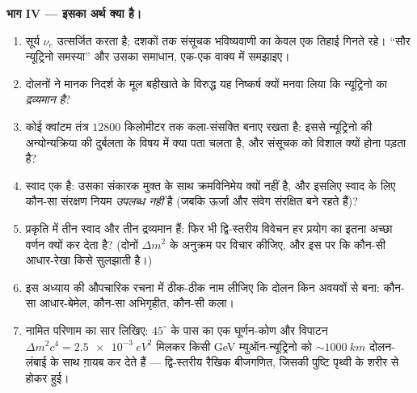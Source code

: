 \begin{problem}[{सप्ताहांत समस्या --- पृथ्वी भर में द्वि-स्तरीय
दोलन}]
\medskip\noindent\textbf{भाग IV --- इसका अर्थ क्या है।}
\begin{enumerate}[resume]
  \item सूर्य $\nu_e$ उत्सर्जित करता है; दशकों तक संसूचक भविष्यवाणी
        का केवल एक तिहाई गिनते रहे। ``सौर न्यूट्रिनो समस्या'' और
        उसका समाधान, एक-एक वाक्य में समझाइए।
  \item दोलनों ने मानक निदर्श के मूल बहीखाते के विरुद्ध यह निष्कर्ष
        क्यों मनवा लिया कि न्यूट्रिनो का \emph{द्रव्यमान है}?
  \item कोई क्वांटम तंत्र $12800$ किलोमीटर तक कला-संसक्ति बनाए रखता
        है: इससे न्यूट्रिनो की अन्योन्यक्रिया की दुर्बलता के विषय में
        क्या पता चलता है, और संसूचक को विशाल क्यों होना पड़ता है?
  \item स्वाद एक  है: उसका संकारक मुक्त
         के साथ क्रमविनिमेय क्यों नहीं है, और इसलिए
        स्वाद के लिए कौन-सा संरक्षण नियम \emph{उपलब्ध नहीं} है
        (जबकि ऊर्जा और संवेग संरक्षित बने रहते हैं)?
  \item प्रकृति में तीन स्वाद और तीन द्रव्यमान हैं: फिर भी
        द्वि-स्तरीय विवेचन हर प्रयोग का इतना अच्छा वर्णन क्यों कर
        देता है? (दोनों $\Delta m^2$ के अनुक्रम पर विचार कीजिए, और
        इस पर कि कौन-सी आधार-रेखा किसे सुलझाती है।)
  \item इस अध्याय की औपचारिक रचना में ठीक-ठीक नाम लीजिए कि दोलन किन
        अवयवों से बना: कौन-सा आधार-बेमेल, कौन-सा अभिगृहीत, कौन-सी कला।
  \item नामित परिणाम का सार लिखिए: $45^\circ$ के पास का एक घूर्णन-कोण
        और विपाटन $\Delta m^2c^4 =
        \qty{2.5e-3}{eV^2}$ मिलकर किसी GeV म्युऑन-न्यूट्रिनो को
        $\sim\qty{1000}{km}$ दोलन-लंबाई के साथ ग़ायब कर देते हैं ---
        द्वि-स्तरीय रैखिक बीजगणित, जिसकी पुष्टि पृथ्वी के शरीर से
        होकर हुई।
\end{enumerate}
\end{problem}

